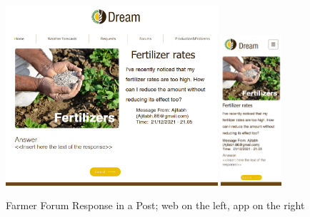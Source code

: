 \documentclass{article}
\begin{document}
        \begin{figure} [h]
            \centering
            \includegraphics[width=0.7\textwidth]{images/UserInterfaces/Farmer/Forum/ResponseInAPostWeb.png}
            \quad
            \includegraphics[width=0.2\textwidth]{images/UserInterfaces/Farmer/Forum/ResponseInAPostApp.png}
            \quad
            \caption{\label{fig:farmerForumPostResponse}Farmer Forum Response in a Post; web on the left, app on the right}
        \end{figure}
    
    
    \newpage
    
\end{document}
